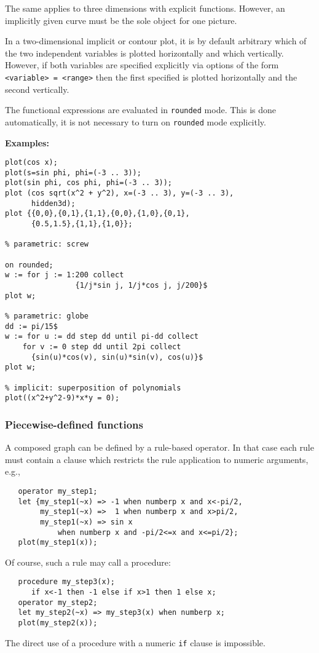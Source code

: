 The same applies to three dimensions with explicit functions. However, an
implicitly given curve must be the sole object for one picture.

In a two-dimensional implicit or contour plot, it is by default
arbitrary which of the two independent variables is plotted
horizontally and which vertically.  However, if both variables are
specified explicitly via options of the form \texttt{<variable> =
  <range>} then the first specified is plotted horizontally and the
second vertically.

The functional expressions are evaluated in \texttt{rounded} mode.
This is done automatically, it is not necessary to turn on
\texttt{rounded} mode explicitly.

\textbf{Examples:}
\begin{verbatim}
plot(cos x);
plot(s=sin phi, phi=(-3 .. 3));
plot(sin phi, cos phi, phi=(-3 .. 3));
plot (cos sqrt(x^2 + y^2), x=(-3 .. 3), y=(-3 .. 3),
      hidden3d);
plot {{0,0},{0,1},{1,1},{0,0},{1,0},{0,1},
      {0.5,1.5},{1,1},{1,0}};

% parametric: screw

on rounded;
w := for j := 1:200 collect
                {1/j*sin j, 1/j*cos j, j/200}$
plot w;

% parametric: globe
dd := pi/15$
w := for u := dd step dd until pi-dd collect
    for v := 0 step dd until 2pi collect
      {sin(u)*cos(v), sin(u)*sin(v), cos(u)}$
plot w;

% implicit: superposition of polynomials
plot((x^2+y^2-9)*x*y = 0);
\end{verbatim}


\subsubsection{Piecewise-defined functions}
A composed graph can be defined by a rule-based operator.  In that case each
rule must contain a clause which restricts the rule application to numeric
arguments, e.g.,
\begin{verbatim}
   operator my_step1;
   let {my_step1(~x) => -1 when numberp x and x<-pi/2,
        my_step1(~x) =>  1 when numberp x and x>pi/2,
        my_step1(~x) => sin x
            when numberp x and -pi/2<=x and x<=pi/2};
   plot(my_step1(x));
\end{verbatim}
Of course, such a rule may call a procedure:
\begin{verbatim}
   procedure my_step3(x);
      if x<-1 then -1 else if x>1 then 1 else x;
   operator my_step2;
   let my_step2(~x) => my_step3(x) when numberp x;
   plot(my_step2(x));
\end{verbatim}
The direct use of a procedure with a numeric \texttt{if} clause is impossible.

